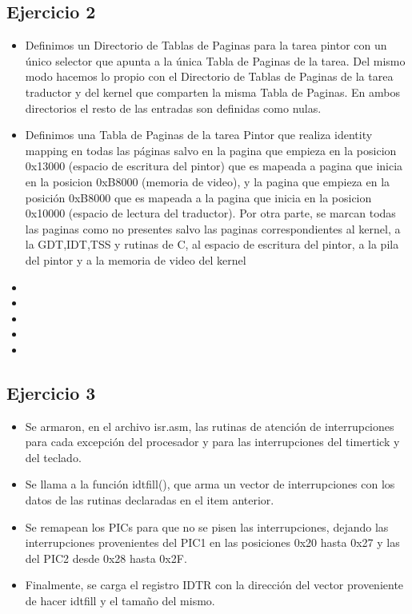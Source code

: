 
\subsection{Ejercicio 2}
\begin{itemize}
 \item Definimos un Directorio de Tablas de Paginas para la tarea pintor con un \'unico selector que apunta a la \'unica Tabla de Paginas de la tarea. Del mismo modo hacemos lo propio con el Directorio de Tablas de Paginas de la tarea traductor y del kernel que comparten la misma Tabla de Paginas. En ambos directorios el resto de las entradas son definidas como nulas.
 \item Definimos una Tabla de Paginas de la tarea Pintor que realiza identity mapping en todas las p\'aginas salvo en la pagina que empieza en la posicion 0x13000 (espacio de escritura del pintor) que es mapeada a pagina que inicia en la posicion 0xB8000 (memoria de video), y la pagina que empieza en la posici\'on 0xB8000 que es mapeada a la pagina que inicia en la posicion 0x10000 (espacio de lectura del traductor). Por otra parte, se marcan todas las paginas como no presentes salvo las paginas correspondientes al kernel, a la GDT,IDT,TSS y rutinas de C, al espacio de escritura del pintor, a la pila del pintor y a la memoria de video del kernel
 \item 
 \item 
 \item 
 \item 
 \item 
\end{itemize}

\subsection{Ejercicio 3}
\begin{itemize}
 \item Se armaron, en el archivo isr.asm, las rutinas de atenci\'on de interrupciones para cada excepci\'on del procesador y para las interrupciones del timertick y del teclado.
 \item Se llama a la funci\'on idtfill(), que arma un vector de interrupciones con los datos de las rutinas declaradas en el item anterior.
 \item Se remapean los PICs para que no se pisen las interrupciones, dejando las interrupciones provenientes del PIC1 en las posiciones 0x20 hasta 0x27 y las del PIC2 desde 0x28 hasta 0x2F.
 \item Finalmente, se carga el registro IDTR con la direcci\'on del vector proveniente de hacer idtfill y el tama\~no del mismo.
\end{itemize}



